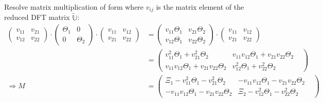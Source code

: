 \documentclass[
	english,
	a4paper,
	fontsize=10pt,
	parskip=half,
	titlepage=true,
	DIV=12,
	final
]{scrreprt}
\newcommand*{\Thus}{\ensuremath{\Rightarrow}\xspace}
\begin{document}
Resolve matrix multiplication of form where $v_{ij}$ is the matrix element of the reduced DFT matrix
$\tilde{\mathbb{U}}$:
\begin{align*}
	\begin{pmatrix}
		v_{11} & v_{21} \\
		v_{12} & v_{22}
	\end{pmatrix}
	\cdot
	\begin{pmatrix}
		\Theta_1 &        0 \\
		       0 & \Theta_2
	\end{pmatrix}
	\cdot
	\begin{pmatrix}
		v_{11} & v_{12} \\
		v_{21} & v_{22}
	\end{pmatrix}
&=
	\begin{pmatrix}
		v_{11} \Theta_1 & v_{21} \Theta_2 \\
		v_{12} \Theta_1 & v_{22} \Theta_2
	\end{pmatrix}
	\cdot
	\begin{pmatrix}
		v_{11} & v_{12} \\
		v_{21} & v_{22}
	\end{pmatrix}
\\
&=
	\begin{pmatrix}
		v_{11}^2      \Theta_1   +   v_{21}^2      \Theta_2 & 
		v_{11} v_{12} \Theta_1   +   v_{21} v_{22} \Theta_2
	\\
		v_{11} v_{12} \Theta_1   +   v_{21} v_{22} \Theta_2 &
		v_{12}^2      \Theta_1   +   v_{22}^2      \Theta_2 & 
	\end{pmatrix}
\\
\Thus
	M
&=
	\begin{pmatrix}
		\Xi_1 - v_{11}^2      \Theta_1   -   v_{21}^2      \Theta_2 & 
		      - v_{11} v_{12} \Theta_1   -   v_{21} v_{22} \Theta_2
	\\
		      - v_{11} v_{12} \Theta_1   -   v_{21} v_{22} \Theta_2 &
		\Xi_2 - v_{12}^2      \Theta_1   -   v_{22}^2      \Theta_2 & 
	\end{pmatrix}
\end{align*}
\end{document}
